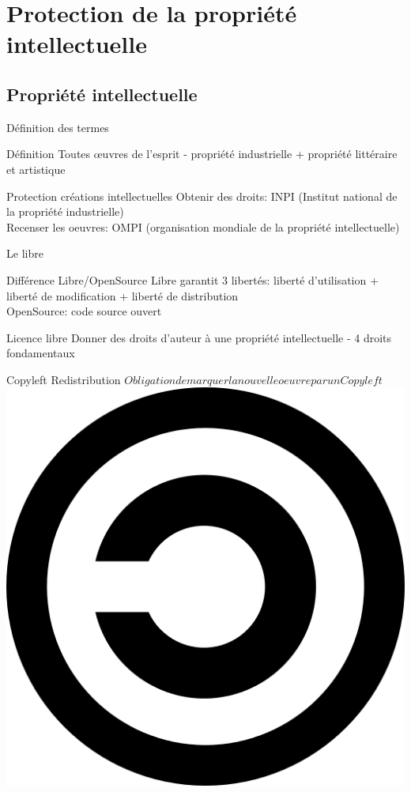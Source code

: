\documentclass{beamer}
\begin{document}
\section{Protection de la propriété intellectuelle}
\subsection{Propriété intellectuelle}
\begin{frame}{Définition des termes}
  \begin{block}{Définition}
    Toutes œuvres de l’esprit - propriété industrielle + propriété littéraire et artistique
  \end{block}
\begin{block}{Protection créations intellectuelles}
Obtenir des droits: INPI (Institut national de la propriété industrielle)\\
Recenser les oeuvres: OMPI (organisation mondiale de la propriété intellectuelle)
\end{block}
\end{frame}
\begin{frame}{Le libre}
  \begin{block}{Différence Libre/OpenSource}
    Libre garantit 3 libertés: liberté d’utilisation + liberté de modiﬁcation + liberté de distribution \\
    OpenSource: code source ouvert
  \end{block}
  \begin{block}{Licence libre}
  Donner des droits d’auteur à une propriété intellectuelle - 4 droits fondamentaux
  \end{block}
  \begin{block}{Copyleft}
  Redistribution \Rightarrow $ Obligation de marquer la nouvelle oeuvre par un Copyleft$ ~
  \includegraphics[scale=0.03]{Copyleft.png}
  \end{block}
\end{frame}
\end{document}
